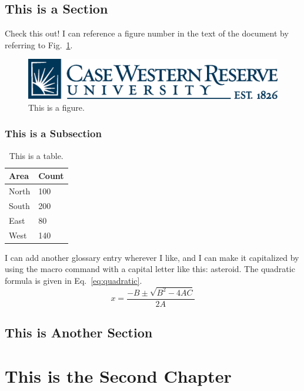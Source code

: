 \documentclass[12pt]{cwru_thesis}
\begin{document}
\section{This is a Section} \label{sec:exsection}
\lipsum[1-2]

Check this out! I can reference a figure number in the text of the document by referring to Fig.~\ref{fig:logo}.

\begin{figure}[hbt!]
    \centering
    \includegraphics[width=.5\textwidth]{cwru_logo.eps}
    \caption{This is a figure. \label{fig:logo}}
\end{figure}

\subsection{This is a Subsection} \label{subsec:exsubsec}

\begin{table}[hbt!]
\centering
\begin{tabular}{ll}
\hline
Area & Count\\
\hline
North & 100\\
South & 200\\
East & 80\\
West & 140\\
\hline
\end{tabular}
\caption{This is a table. \label{tab:sample}}
\end{table}

\lipsum[3] 

I can add another glossary entry wherever I like, and I can make it capitalized by using the macro command with a capital letter like this: \Gls{asteroid}. The quadratic formula is given in Eq.~\eqref{eq:quadratic}.
\begin{equation}
    x=\frac{-B \pm \sqrt{B^2 - 4AC}}{2A}
    \label{eq:quadratic}
\end{equation}

\lipsum[4-5] 

\section{This is Another Section}
\lipsum[6-7] 

\chapter{This is the Second Chapter}
\lipsum[8-9]
\end{document}
